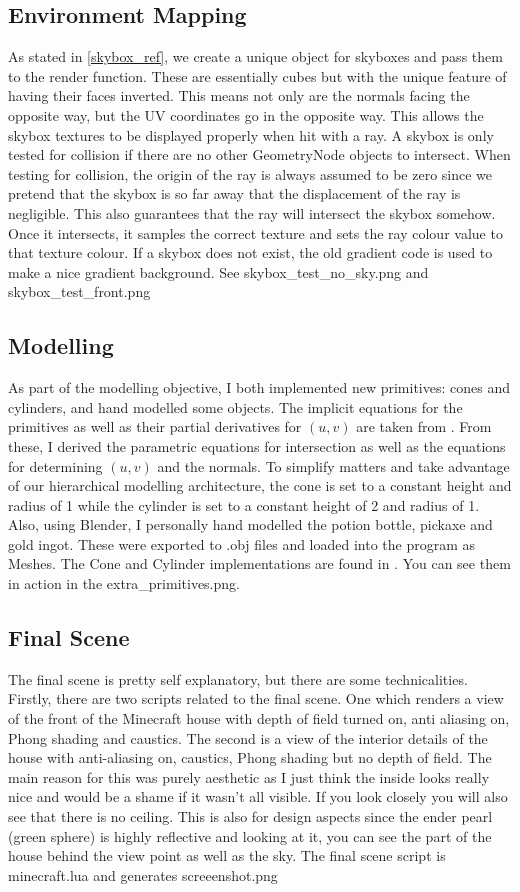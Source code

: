\documentclass {article}
\begin{document}
\subsection{Environment Mapping}
As stated in \ref{skybox_ref}, we create a unique object for skyboxes and pass them to the render function. These
are essentially cubes but with the unique feature of having their faces inverted. This means not only are the normals
facing the opposite way, but the UV coordinates go in the opposite way. This allows the skybox textures to be displayed
properly when hit with a ray. A skybox is only tested for collision if there are no other GeometryNode objects to intersect.
When testing for collision, the origin of the ray is always assumed to be zero since we pretend that the skybox
is so far away that the displacement of the ray is negligible. This also guarantees that the ray will intersect the skybox
somehow. Once it intersects, it samples the correct texture and sets the ray colour value to that texture colour.
If a skybox does not exist, the old gradient code is used to make a nice gradient background. See skybox\_test\_no\_sky.png
and skybox\_test\_front.png
\subsection{Modelling}
As part of the modelling objective, I both implemented new primitives: cones and cylinders, and hand modelled some objects.
The implicit equations for the primitives
as well as their partial derivatives for $(u,v)$ are taken from \cite{PBR}. From these, I derived the parametric equations
for intersection as well as the equations for determining $(u,v)$ and the normals. To simplify matters and take advantage of
our hierarchical modelling architecture, the cone is set to a constant height and radius of 1 while the cylinder is 
set to a constant height of 2 and radius of 1. Also, using Blender, I personally hand modelled the potion bottle, pickaxe
and gold ingot. These were exported to .obj files and loaded into the program as Meshes. The Cone and Cylinder
implementations are found in . You can see them in action in the extra\_primitives.png.
\subsection{Final Scene}
The final scene is pretty self explanatory, but there are some technicalities. Firstly, there
are two scripts related to the final scene. One which renders a view of the front of the Minecraft
house with depth of field turned on, anti aliasing on, Phong shading and caustics. The second is a view of the interior
details of the house with anti-aliasing on, caustics, Phong shading but no depth of field. The main reason for this 
was purely aesthetic as I just think the inside looks really nice and would be a shame if it wasn't all visible.
If you look closely you will also see that there is no ceiling. This is also for design aspects since the ender pearl
(green sphere) is highly reflective and looking at it, you can see the part of the house behind the view point as well
as the sky. The final scene script is minecraft.lua and generates screeenshot.png
\end{document}
